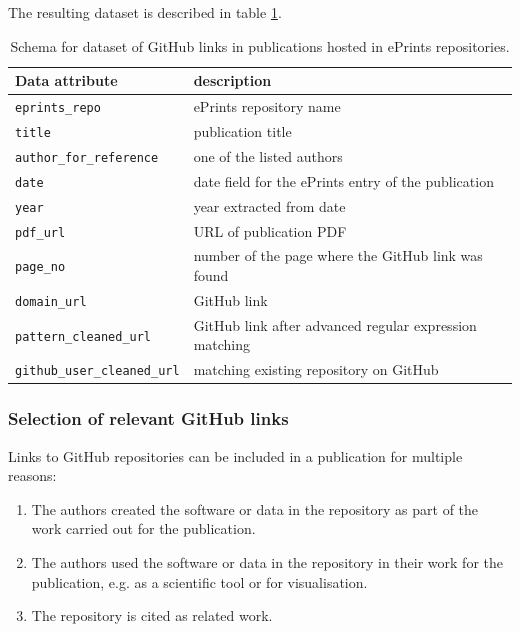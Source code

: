 \documentclass[10pt,a4paper]{scrartcl}
\begin{document}
The resulting dataset is described in table \ref{table:github_eprints}.

\begin{table}
    \begin{tabular}{|l|l|}
        \hline
        Data attribute & description \\
        \hline 
        \verb|eprints_repo| & ePrints repository name\\
        \verb|title| & publication title\\
        \verb|author_for_reference| & one of the listed authors\\
        \verb|date| & date field for the ePrints entry of the publication\\
        \verb|year| & year extracted from date\\
        \verb|pdf_url| & URL of publication PDF\\
        \verb|page_no| & number of the page where the GitHub link was found\\
        \verb|domain_url| & GitHub link\\
        \verb|pattern_cleaned_url| & GitHub link after advanced regular expression matching\\
        \verb|github_user_cleaned_url| & matching existing repository on GitHub\\
        \hline
    \end{tabular}
    \caption{Schema for dataset of GitHub links in publications hosted in ePrints repositories.}
    \label{table:github_eprints}
\end{table}

\subsubsection*{Selection of relevant GitHub links}
\label{section:select_links}

Links to GitHub repositories can be included in a publication for multiple reasons:
\begin{enumerate}
    \item The authors created the software or data in the repository as part of the work carried out for the publication.
    \item The authors used the software or data in the repository in their work for the publication, e.g. as a scientific tool or for visualisation.
    \item The repository is cited as related work.
\end{enumerate}
\end{document}

